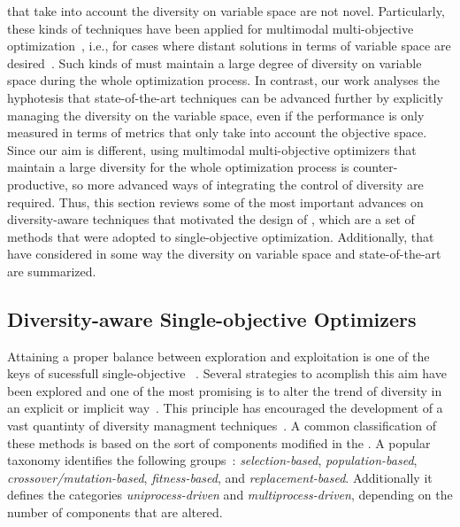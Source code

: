 \MOEAS{} that take into account the diversity on variable space are not novel.
%
Particularly, these kinds of techniques have been applied for multimodal multi-objective optimization~\cite{Liang:16},
i.e., for cases where distant solutions in terms of variable space are desired~\cite{deb2008omni, cuate2019variation}.
%
Such kinds of \MOEAS{} must maintain a large degree of diversity on variable space during the whole optimization process.
%
In contrast, our work analyses the hyphotesis that state-of-the-art techniques can be advanced further by explicitly managing
the diversity on the variable space, even if the performance is only measured in terms of metrics that only take into account 
the objective space.
%
Since our aim is different, using multimodal multi-objective optimizers that maintain a large diversity 
for the whole optimization process is counter-productive, 
so more advanced ways of integrating the control of diversity are required.
%
Thus, this section reviews some of the most important advances on diversity-aware techniques that motivated the
design of \VSDMOEAD{}, which are a set of methods that were adopted to single-objective optimization.
%
Additionally, \MOEAS{} that have considered in some way the diversity on variable space and
state-of-the-art \MOEAS{} are summarized.

\subsection{Diversity-aware Single-objective Optimizers}

Attaining a proper balance between exploration and exploitation is one of the keys of sucessfull single-objective
\EAS{}~\cite{lin2009auto}.
%
Several strategies to acomplish this aim have been explored and one of the most promising is to alter the trend
of diversity in an explicit or implicit way~\cite{Joel:Crepinsek}.
%
This principle has encouraged the development of a vast quantinty of diversity managment techniques~\cite{pandey2014comparative}.
%
A common classification of these methods is based on the sort of components modified in the \EA{}.
%
A popular taxonomy identifies the following groups~\cite{Joel:Crepinsek}: \textit{selection-based}, \textit{population-based}, \textit{crossover/mutation-based}, \textit{fitness-based}, and \textit{replacement-based}.
%
Additionally it defines the categories \textit{uniprocess-driven} and \textit{multiprocess-driven}, depending on the number
of components that are altered.

